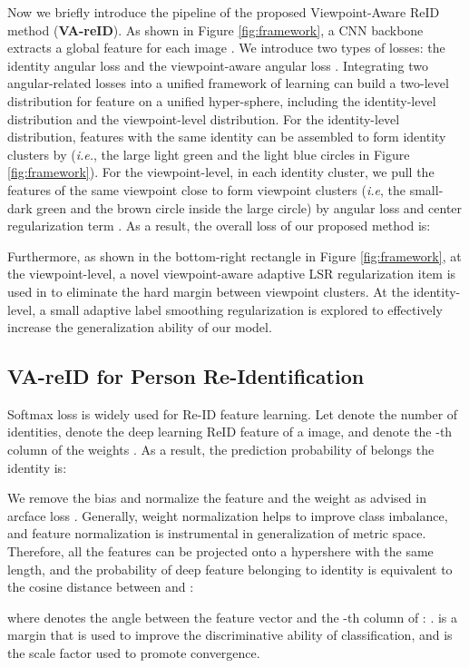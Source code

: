 \documentclass[letterpaper]{article} \usepackage{aaai20}  \usepackage{times}  \usepackage{helvet} \usepackage{courier}  \usepackage[hyphens]{url}  \usepackage{graphicx} \usepackage{array}
\begin{document}
Now we briefly introduce the pipeline of the proposed Viewpoint-Aware ReID method (\textbf{VA-reID}). As shown in Figure \ref{fig:framework}, a CNN backbone extracts a global feature  for each image . We introduce two types of losses: the identity angular loss  and the viewpoint-aware angular loss . Integrating two angular-related losses into a unified framework of learning can build a two-level distribution for feature  on a unified hyper-sphere, including the identity-level distribution and the viewpoint-level distribution. For the identity-level distribution, features with the same identity can be assembled to form identity clusters by  (\textit{i.e.}, the large light green and the light blue circles in Figure \ref{fig:framework}). For the viewpoint-level, in each identity cluster, we pull the features of the same viewpoint close to form viewpoint clusters (\textit{i.e}, the small-dark green and the brown circle inside the large circle) by angular loss  and center regularization term . As a result, the overall loss of our proposed method is:

Furthermore, as shown in the bottom-right rectangle in Figure \ref{fig:framework}, at the viewpoint-level, a novel viewpoint-aware adaptive LSR regularization item is used in  to eliminate the hard margin between viewpoint clusters. At the identity-level, a small adaptive label smoothing regularization is explored to effectively increase the generalization ability of our model.  



\subsection{VA-reID for Person Re-Identification}
Softmax loss is widely used for Re-ID feature learning. Let  denote the number of identities,  denote the deep learning ReID feature of a image, and  denote the -th column of the weights . As a result,  the prediction probability of  belongs the identity  is:


We remove the bias and normalize the feature  and the weight  as advised in arcface loss \cite{Deng_2019_CVPR}. Generally, weight normalization helps to improve class imbalance, and feature normalization is instrumental in generalization of metric space. Therefore, all the features can be projected onto a hypershere with the same length, and the probability of deep feature  belonging to identity   is equivalent to the cosine distance between  and :

where  denotes the angle between the feature vector  and the -th column of  : .  is a margin that is used to improve the discriminative ability of classification, and  is the scale factor used to promote convergence. 
\end{document}
